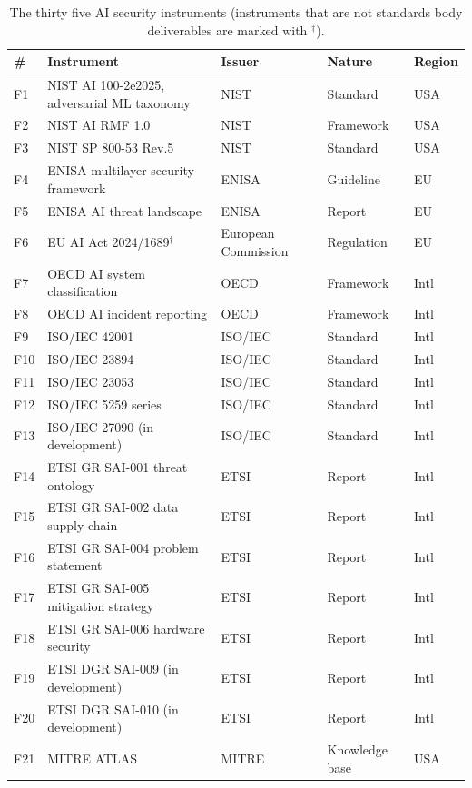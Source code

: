\documentclass[runningheads]{llncs}
\begin{document}
\begin{table}[t]
\caption{The thirty five AI security instruments (instruments that are not standards body deliverables are marked with $^\dagger$).}
\label{tab:census}
\centering
\footnotesize
\begin{tabular}{@{}p{0.8cm}p{5.5cm}p{2.5cm}p{2.3cm}p{2.3cm}@{}}
\toprule
\textbf{\#} & \textbf{Instrument} & \textbf{Issuer} & \textbf{Nature} & \textbf{Region}\\
\midrule
F1  & NIST AI 100-2e2025, adversarial ML taxonomy & NIST & Standard & USA\\
F2  & NIST AI RMF 1.0 & NIST & Framework & USA\\
F3  & NIST SP 800-53 Rev.5 & NIST & Standard & USA\\
F4  & ENISA multilayer security framework & ENISA & Guideline & EU\\
F5  & ENISA AI threat landscape & ENISA & Report & EU\\
F6  & EU AI Act 2024/1689$^\dagger$ & European Commission & Regulation & EU\\
F7  & OECD AI system classification & OECD & Framework & Intl\\
F8  & OECD AI incident reporting & OECD & Framework & Intl\\
F9  & ISO/IEC 42001 & ISO/IEC & Standard & Intl\\
F10 & ISO/IEC 23894 & ISO/IEC & Standard & Intl\\
F11 & ISO/IEC 23053 & ISO/IEC & Standard & Intl\\
F12 & ISO/IEC 5259 series & ISO/IEC & Standard & Intl\\
F13 & ISO/IEC 27090 (in development) & ISO/IEC & Standard & Intl\\
F14 & ETSI GR SAI-001 threat ontology & ETSI & Report & Intl\\
F15 & ETSI GR SAI-002 data supply chain & ETSI & Report & Intl\\
F16 & ETSI GR SAI-004 problem statement & ETSI & Report & Intl\\
F17 & ETSI GR SAI-005 mitigation strategy & ETSI & Report & Intl\\
F18 & ETSI GR SAI-006 hardware security & ETSI & Report & Intl\\
F19 & ETSI DGR SAI-009 (in development) & ETSI & Report & Intl\\
F20 & ETSI DGR SAI-010 (in development) & ETSI & Report & Intl\\
F21 & MITRE ATLAS & MITRE & Knowledge base & USA\\

\end{tabular}
\end{table}
\end{document}
